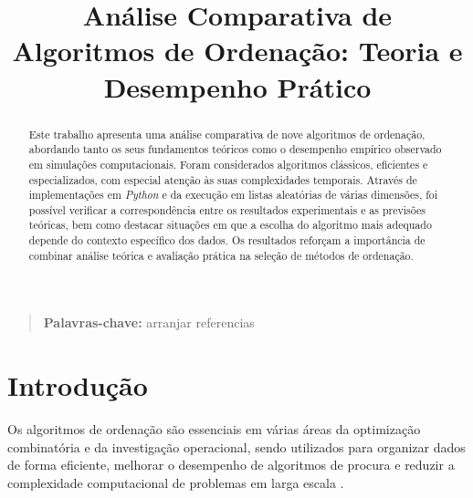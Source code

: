 \documentclass[conference]{IEEEtran}
\begin{document}
\title{Análise Comparativa de Algoritmos de Ordenação: Teoria e Desempenho Prático}

\author{
\and
{}
}

\maketitle
\thispagestyle{plain}

\begin{abstract}
Este trabalho apresenta uma análise comparativa de nove algoritmos de ordenação, abordando tanto os seus fundamentos teóricos como o desempenho empírico observado em simulações computacionais. Foram considerados algoritmos clássicos, eficientes e especializados, com especial atenção às suas complexidades temporais. Através de implementações em \textit{Python} e da execução em listas aleatórias de várias dimensões, foi possível verificar a correspondência entre os resultados experimentais e as previsões teóricas, bem como destacar situações em que a escolha do algoritmo mais adequado depende do contexto específico dos dados. Os resultados reforçam a importância de combinar análise teórica e avaliação prática na seleção de métodos de ordenação.
\end{abstract}

\begin{quote}
\small
\noindent
\textbf{Palavras-chave:} arranjar referencias
\end{quote}

\IEEEpeerreviewmaketitle

\section{Introdução}

Os algoritmos de ordenação são essenciais em várias áreas da optimização combinatória e da investigação operacional, sendo utilizados para organizar dados de forma eficiente, melhorar o desempenho de algoritmos de procura e reduzir a complexidade computacional de problemas em larga escala \cite{intro1}.
\end{document}

